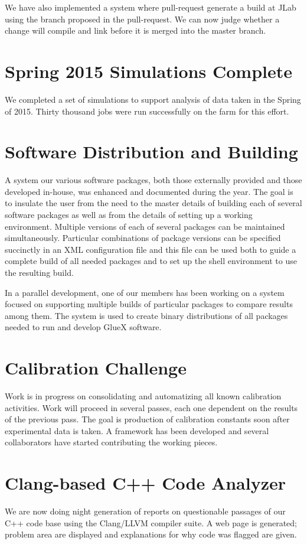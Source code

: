 \documentclass[12pt]{article}
\begin{document}
We have also implemented a system where pull-request generate a build
at JLab using the branch proposed in the pull-request. We can now
judge whether a change will compile and link before it is merged into
the master branch.

\section{Spring 2015 Simulations Complete}

We completed a set of simulations to support analysis of data taken in
the Spring of 2015. Thirty thousand jobs were run successfully on the
farm for this effort.

\section{Software Distribution and Building}

A system our various software packages, both those externally provided
and those developed in-house, was enhanced and documented during the
year. The goal is to insulate the user from the need to the master
details of building each of several software packages as well as from
the details of setting up a working environment. Multiple versions of
each of several packages can be maintained simultaneously. Particular
combinations of package versions can be specified succinctly in an XML
configuration file and this file can be used both to guide a complete
build of all needed packages and to set up the shell environment to
use the resulting build.

In a parallel development, one of our members has been working on a
system focused on supporting multiple builds of particular packages to
compare results among them. The system is used to create binary
distributions of all packages needed to run and develop GlueX
software.

\section{Calibration Challenge}

Work is in progress on consolidating and automatizing all known calibration activities. Work will proceed in several passes, each one dependent on the results of the previous pass. The goal is production of calibration constants soon after experimental data is taken. A framework has been developed and several collaborators have started contributing the working pieces.

\section{Clang-based C++ Code Analyzer}

We are now doing night generation of reports on questionable passages of our C++ code base using the Clang/LLVM compiler suite. A web page is generated; problem area are displayed and explanations for why code was flagged are given.
\end{document}
